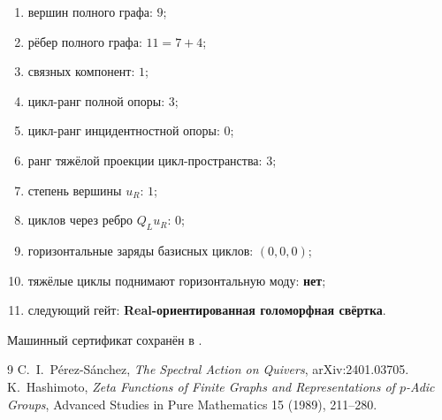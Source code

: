 \begin{protocol}
\begin{enumerate}
 \item вершин полного графа: \textbf{$9$};
 \item рёбер полного графа: \textbf{$11=7+4$};
 \item связных компонент: \textbf{$1$};
 \item цикл-ранг полной опоры: \textbf{$3$};
 \item цикл-ранг инцидентностной опоры: \textbf{$0$};
 \item ранг тяжёлой проекции цикл-пространства: \textbf{$3$};
 \item степень вершины $u_R$: \textbf{$1$};
 \item циклов через ребро $Q_Lu_R$: \textbf{$0$};
 \item горизонтальные заряды базисных циклов: \textbf{$(0,0,0)$};
 \item тяжёлые циклы поднимают горизонтальную моду: \textbf{нет};
 \item следующий гейт: \textbf{Real-ориентированная голоморфная свёртка}.
\end{enumerate}
\end{protocol}

Машинный сертификат сохранён в
.

\begin{thebibliography}{9}
C.~I.~P\'erez-S\'anchez,
\emph{The Spectral Action on Quivers}, arXiv:2401.03705.
K.~Hashimoto,
\emph{Zeta Functions of Finite Graphs and Representations of
$p$-Adic Groups}, Advanced Studies in Pure Mathematics 15 (1989),
211--280.
\end{thebibliography}